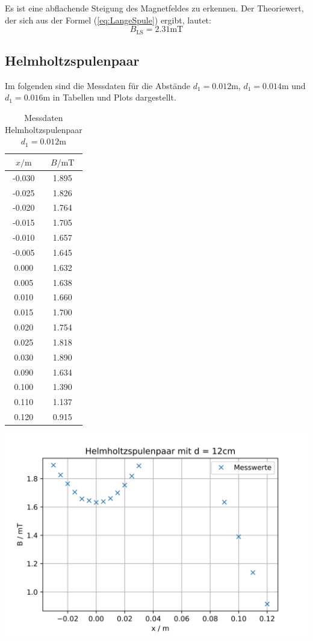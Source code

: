 Es ist eine abflachende Steigung des Magnetfeldes zu erkennen. Der Theoriewert, der sich aus der Formel (\ref{eq:LangeSpule}) ergibt, lautet:
\begin{equation}
  B_{\text{LS}} = 2.31 \unit{\milli\tesla}
\end{equation}


\subsection{Helmholtzspulenpaar}

Im folgenden sind die Messdaten für die Abstände $d_{1} = 0.012\unit\m$, $d_{1} = 0.014\unit\m$ und $d_{1} = 0.016\unit\m$ in Tabellen und Plots dargestellt.

\begin{table}
\centering
\caption{Messdaten Helmholtzspulenpaar $d_{1} = 0.012\unit\m$}
\begin{tabular}{c c}
  \toprule
  $x / \unit\m$ &  $B / \unit{\milli\tesla}$ \\
  \midrule
  -0.030 &        1.895 \\
  -0.025 &        1.826 \\
  -0.020 &        1.764 \\
  -0.015 &        1.705 \\
  -0.010 &        1.657 \\
  -0.005 &        1.645 \\
   0.000 &        1.632 \\
   0.005 &        1.638 \\
   0.010 &        1.660 \\
   0.015 &        1.700 \\
   0.020 &        1.754 \\
   0.025 &        1.818 \\
   0.030 &        1.890 \\
   0.090 &        1.634 \\
   0.100 &        1.390 \\
   0.110 &        1.137 \\
   0.120 &        0.915 \\
  \bottomrule
\end{tabular}
\end{table}

\includegraphics[width=\textwidth]{pictures/Helmholtz1.png}    %

